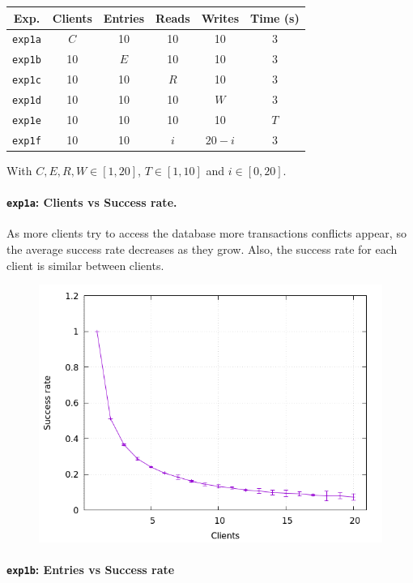 \documentclass[a4paper, 11pt]{article}
\begin{document}
\begin{table}[H]
\centering
\begin{tabular}{c c c c c c}
\toprule
Exp.						&	Clients	&	Entries	&	Reads & Writes	& Time (s)	\\
\midrule
\texttt{exp1a}	&	$C$			&	10			& 10		&	10			&	3					\\
\texttt{exp1b}	&	10			&	$E$			& 10		&	10			&	3					\\
\texttt{exp1c}	&	10			&	10			& $R$		&	10			&	3					\\
\texttt{exp1d}	&	10			&	10			& 10		&	$W$			&	3					\\
\texttt{exp1e}	&	10			&	10			& 10		&	10			&	$T$				\\
\texttt{exp1f}	&	10			&	10			& $i$		&	$20-i$	&	3					\\
\bottomrule
\end{tabular}
\end{table}

With $C,E,R,W \in [1,20]$, $T \in [1,10]$ and $i \in [0,20]$.

\paragraph{\texttt{exp1a}: Clients vs Success rate.}

As more clients try to access the database more transactions conflicts appear, 
so the average success rate decreases as they grow. Also, the success rate for 
each client is similar between clients.

\begin{figure}[H]
\centering
\includegraphics[width=.8\linewidth]{exp1/a/fig.png}
\end{figure}

\paragraph{\texttt{exp1b}: Entries vs Success rate}
\end{document}
